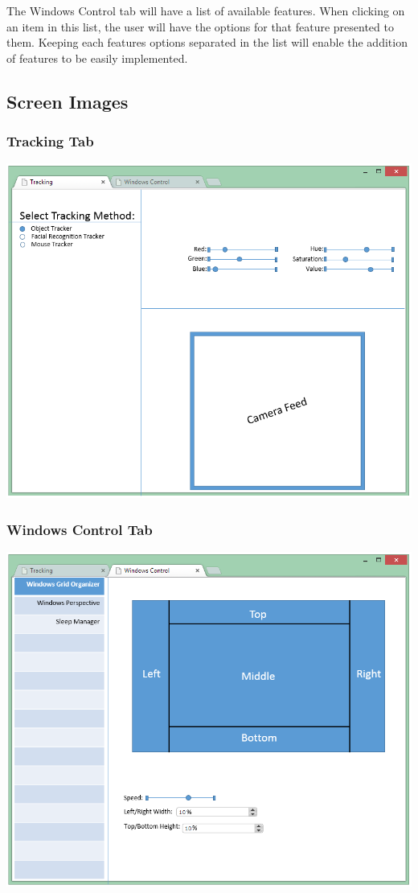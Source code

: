 \documentclass[titlepage]{article}
\begin{document}
The Windows Control tab will have a list of available features. When clicking on an item in this list, the user will have the options for that feature presented to them. Keeping each features options separated in the list will enable the addition of features to be easily implemented. 

\subsection{Screen Images}
\subsubsection{Tracking Tab}
\includegraphics[scale=0.8]{gui/tracking_tab.png}

\subsubsection{Windows Control Tab}
\includegraphics[scale=0.8]{gui/windows_control_tab.png}
\end{document}
